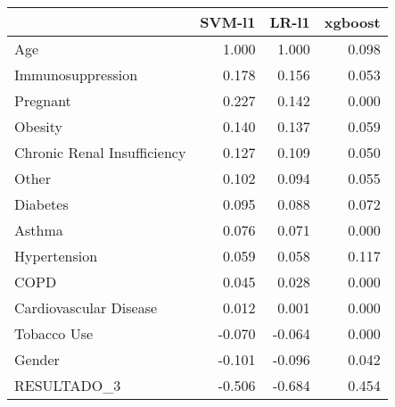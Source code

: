 \begin{tabular}{lrrr}
\toprule
{} &  SVM-l1 &  LR-l1 &  xgboost \\
\midrule
Age                         &   1.000 &  1.000 &    0.098 \\
Immunosuppression           &   0.178 &  0.156 &    0.053 \\
Pregnant                    &   0.227 &  0.142 &    0.000 \\
Obesity                     &   0.140 &  0.137 &    0.059 \\
Chronic Renal Insufficiency &   0.127 &  0.109 &    0.050 \\
Other                       &   0.102 &  0.094 &    0.055 \\
Diabetes                    &   0.095 &  0.088 &    0.072 \\
Asthma                      &   0.076 &  0.071 &    0.000 \\
Hypertension                &   0.059 &  0.058 &    0.117 \\
COPD                        &   0.045 &  0.028 &    0.000 \\
Cardiovascular Disease      &   0.012 &  0.001 &    0.000 \\
Tobacco Use                 &  -0.070 & -0.064 &    0.000 \\
Gender                      &  -0.101 & -0.096 &    0.042 \\
RESULTADO\_3                 &  -0.506 & -0.684 &    0.454 \\
\bottomrule
\end{tabular}
